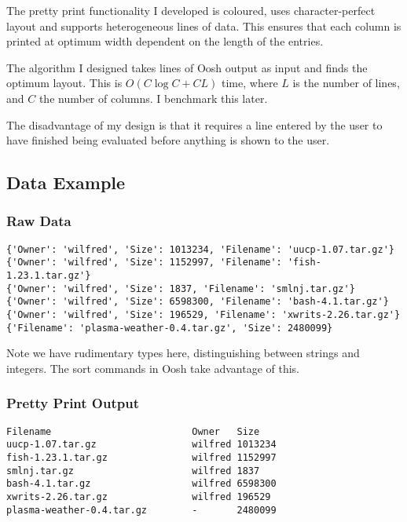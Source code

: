\documentclass[12pt,twoside,notitlepage]{report}
\begin{document}
The pretty print functionality I developed is coloured, uses character-perfect
layout and supports heterogeneous lines of data. This ensures that each column
is printed at optimum width dependent on the length of the
entries. 

The algorithm I designed takes lines of Oosh output as input and finds
the optimum layout. This is $O(C \log C + CL)$ time, where $L$ is the
number of lines, and $C$ the number of columns. I benchmark this
later. %

The disadvantage of my design is that it requires a line entered by
the user to have finished being evaluated before anything is shown to
the user. 



\subsection{Data Example}
\subsubsection{Raw Data}
\begin{verbatim}
{'Owner': 'wilfred', 'Size': 1013234, 'Filename': 'uucp-1.07.tar.gz'}
{'Owner': 'wilfred', 'Size': 1152997, 'Filename': 'fish-1.23.1.tar.gz'}
{'Owner': 'wilfred', 'Size': 1837, 'Filename': 'smlnj.tar.gz'}
{'Owner': 'wilfred', 'Size': 6598300, 'Filename': 'bash-4.1.tar.gz'}
{'Owner': 'wilfred', 'Size': 196529, 'Filename': 'xwrits-2.26.tar.gz'}
{'Filename': 'plasma-weather-0.4.tar.gz', 'Size': 2480099}
\end{verbatim}
Note we have rudimentary types here, distinguishing between strings and
integers. The sort commands in Oosh take advantage of this.

\subsubsection{Pretty Print Output}
\begin{verbatim}
Filename                         Owner   Size      
uucp-1.07.tar.gz                 wilfred 1013234   
fish-1.23.1.tar.gz               wilfred 1152997   
smlnj.tar.gz                     wilfred 1837      
bash-4.1.tar.gz                  wilfred 6598300   
xwrits-2.26.tar.gz               wilfred 196529    
plasma-weather-0.4.tar.gz        -       2480099
\end{verbatim}
\end{document}
